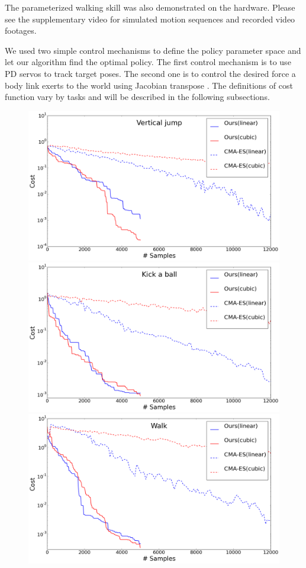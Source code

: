 The parameterized walking skill was also demonstrated on the
hardware. Please see the supplementary video for simulated motion
sequences and recorded video footages.

We used two simple control mechanisms to define the policy parameter
space and let our algorithm find the optimal policy. The first control
mechanism is to use PD servos to track target poses. The second one
is to control the desired force a body link exerts to the world using
Jacobian transpose \cite{Sunada:1994:ACJ}. The definitions of cost function
vary by tasks and will be described in the following subsections.

\begin{figure}
\center
  \includegraphics[width=4.5in]{images/iter_values_00}
  \includegraphics[width=4.5in]{images/iter_values_01}
  \includegraphics[width=4.5in]{images/iter_values_02}

\end{figure}
